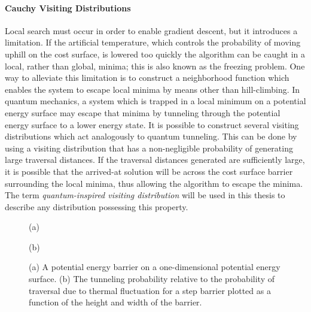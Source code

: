 \documentclass[11pt]{afthesis}
\begin{document}
	\paragraph{Cauchy Visiting Distributions}
	\label{visiting_distribution_abstract_cauchy}
	
	Local search must occur in order to enable gradient descent, but it introduces a limitation. If the artificial temperature, which controls the probability of moving uphill on the cost surface, is lowered too quickly the algorithm can be caught in a local, rather than global, minima; this is also known as the freezing problem. One way to alleviate this limitation is to construct a neighborhood function which enables the system to escape local minima by means other than hill-climbing. In quantum mechanics, a system which is trapped in a local minimum on a potential energy surface may escape that minima by tunneling through the potential energy surface to a lower energy state. It is possible to construct several visiting distributions which act analogously to quantum tunneling. This can be done by using a visiting distribution that has a non-negligible probability of generating large traversal distances. If the traversal distances generated are sufficiently large, it is possible that the arrived-at solution will be across the cost surface barrier surrounding the local minima, thus allowing the algorithm to escape the minima. The term \textit{quantum-inspired visiting distribution} will be used in this thesis to describe any distribution possessing this property.
	
	\begin{figure}[ht!]
		
		\begin{minipage}[b]{0.48\linewidth}
			\centering
			\centerline{}
			\centerline{(a)}\medskip
		\end{minipage}
		\hfill
		\begin{minipage}[b]{0.48\linewidth}
			\centering
			\centerline{}
			\centerline{(b)}\medskip
		\end{minipage}
		\caption{
			(a) A potential energy barrier on a one-dimensional potential energy surface.
			(b) The tunneling probability relative to the probability of traversal due to thermal fluctuation for a step barrier plotted as a function of the height and width of the barrier.}
		\label{fig:quantum_advantage}
	\end{figure}
		
\end{document}
